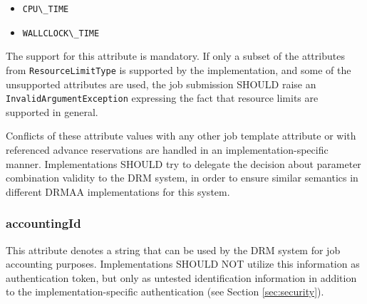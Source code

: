 \documentclass{article}
\newcommand{\h}[1]{\lstinline|#1|}
\newcommand{\rat}[1]{}
\begin{document}
\begin{itemize}
\item \h{CPU\_TIME}
\item \h{WALLCLOCK\_TIME}
\end{itemize} 

The support for this attribute is mandatory. If only a subset of the attributes from \h{ResourceLimitType} is supported by the implementation, and some of the unsupported attributes are used, the job submission SHOULD raise an \h{InvalidArgumentException} expressing the fact that resource limits are supported in general. 

Conflicts of these attribute values with any other job template attribute or with referenced advance reservations are handled in an implementation-specific manner. Implementations SHOULD try to delegate the decision about parameter combination validity to the DRM system, in order to ensure similar semantics in different DRMAA implementations for this system.

\rat{
In comparison to DRMAA 1.0, resource usage limitations can now be expressed by two dictionaries and an according standardized set of valid dictionary keys (LimitType). The idea is to allow a direct mapping to ulimit(3) semantics, which are supported by the majority of DRM system today. A separate run duration limit is no longer needed, since this is covered by the new CPU\_TIME limit parameter. (conf. call Jun 9th 2010). 

This distinguishing between different reactions on limit violation was restricted to the job entering, or not entering, the FAILED state. All further effects (e.g., no more \emph{open()} calls possible) are out of scope for DRMAA, since they relate to operating system behavior on  execution host (conf call May 4th 2011). 

The attribute is mandatory, since the missing general support for resource limits can be simply expressed by raising InvalidArgumentException for all types.
} 

\subsubsection{accountingId}

This attribute denotes a string that can be used by the DRM system for job accounting purposes. Implementations SHOULD NOT utilize this information as authentication token, but only as untested identification information in addition to the implementation-specific authentication (see Section \ref{sec:security}).
\end{document}
